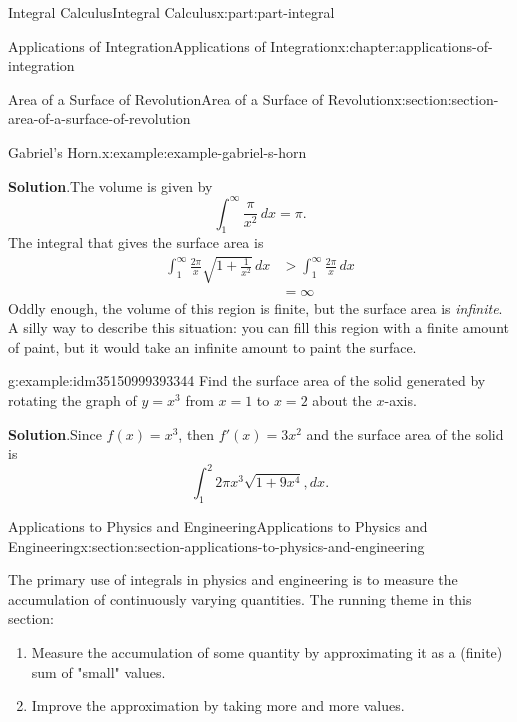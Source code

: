 \documentclass[twoside,10pt,]{book}
\newcommand{\blocktitlefont}{\relax}
\numberwithin{equation}{part}
\newcommand{\gt}{>}
\newcommand{\amp}{&}
\begin{document}
\begin{partptx}{Integral Calculus}{}{Integral Calculus}{}{}{x:part:part-integral}
\begin{chapterptx}{Applications of Integration}{}{Applications of Integration}{}{}{x:chapter:applications-of-integration}
\begin{sectionptx}{Area of a Surface of Revolution}{}{Area of a Surface of Revolution}{}{}{x:section:section-area-of-a-surface-of-revolution}
\begin{example}{Gabriel's Horn.}{x:example:example-gabriel-s-horn}
\par\smallskip%
\noindent\textbf{\blocktitlefont Solution}.\hypertarget{g:solution:idm35150999395392}{}\quad{}The volume is given by%
\begin{equation*}
\int_{1}^{\infty}\frac{\pi}{x^{2}}\,dx = \pi\text{.}
\end{equation*}
The integral that gives the surface area is%
%
\begin{align*}
\int_{1}^{\infty}\frac{2\pi}{x}\sqrt{1 + \frac{1}{x^{2}}}\,dx \amp \gt \int_{1}^{\infty}\frac{2\pi}{x}\,dx \\
\amp = \infty 
\end{align*}
Oddly enough, the volume of this region is finite, but the surface area is \emph{infinite}. A silly way to describe this situation: you can fill this region with a finite amount of paint, but it would take an infinite amount to paint the surface.%
\end{example}
\begin{example}{}{g:example:idm35150999393344}%
Find the surface area of the solid generated by rotating the graph of \(y=x^{3}\) from \(x=1\) to \(x=2\) about the \(x\)-axis.%
\par\smallskip%
\noindent\textbf{\blocktitlefont Solution}.\hypertarget{g:solution:idm35150999391296}{}\quad{}Since \(f(x)=x^{3}\), then \(f'(x)=3x^{2}\) and the surface area of the solid is%
\begin{equation*}
\int_{1}^{2}2\pi x^{3}\sqrt{1+9x^{4}},dx.
\end{equation*}
%
\end{example}
\end{sectionptx}
%
%
\typeout{************************************************}
\typeout{************************************************}
%
\begin{sectionptx}{Applications to Physics and Engineering}{}{Applications to Physics and Engineering}{}{}{x:section:section-applications-to-physics-and-engineering}
\begin{introduction}{}%
The primary use of integrals in physics and engineering is to measure the accumulation of continuously varying quantities. The running theme in this section:%
%
\begin{enumerate}
\item{}Measure the accumulation of some quantity by approximating it as a (finite) sum of "small" values.%
\item{}Improve the approximation by taking more and more values.%

\end{enumerate}
\end{introduction}
\end{sectionptx}
\end{chapterptx}
\end{partptx}
\end{document}
